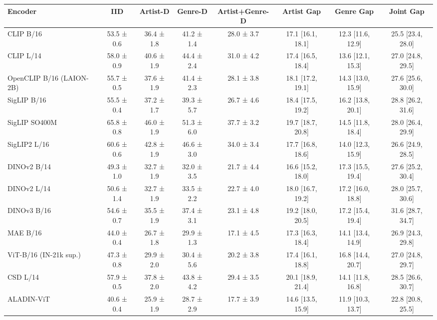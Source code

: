 \begin{tabular}{lccccccc}
\toprule
Encoder & IID & Artist-D & Genre-D & Artist+Genre-D & Artist Gap & Genre Gap & Joint Gap \\
\midrule
CLIP B/16 & 53.5 ± 0.6 & 36.4 ± 1.8 & 41.2 ± 1.4 & 28.0 ± 3.7 & 17.1 [16.1, 18.1] & 12.3 [11.6, 12.9] & 25.5 [23.4, 28.0] \\
CLIP L/14 & 58.0 ± 0.9 & 40.6 ± 1.9 & 44.4 ± 2.4 & 31.0 ± 4.2 & 17.4 [16.5, 18.4] & 13.6 [12.1, 15.3] & 27.0 [24.8, 29.5] \\
OpenCLIP B/16 (LAION-2B) & 55.7 ± 0.5 & 37.6 ± 1.9 & 41.4 ± 2.3 & 28.1 ± 3.8 & 18.1 [17.2, 19.1] & 14.3 [13.0, 15.9] & 27.6 [25.6, 30.0] \\
SigLIP B/16 & 55.5 ± 0.4 & 37.2 ± 1.7 & 39.3 ± 5.7 & 26.7 ± 4.6 & 18.4 [17.5, 19.2] & 16.2 [13.8, 20.1] & 28.8 [26.2, 31.6] \\
SigLIP SO400M & 65.8 ± 0.8 & 46.0 ± 1.9 & 51.3 ± 6.0 & 37.7 ± 3.2 & 19.7 [18.7, 20.8] & 14.5 [11.8, 18.4] & 28.0 [26.4, 29.9] \\
SigLIP2 L/16 & 60.6 ± 0.6 & 42.8 ± 1.9 & 46.6 ± 3.0 & 34.0 ± 3.4 & 17.7 [16.8, 18.6] & 14.0 [12.3, 15.9] & 26.6 [24.9, 28.5] \\
DINOv2 B/14 & 49.3 ± 1.0 & 32.7 ± 1.9 & 32.0 ± 3.5 & 21.7 ± 4.4 & 16.6 [15.2, 18.0] & 17.3 [15.5, 19.4] & 27.6 [25.2, 30.4] \\
DINOv2 L/14 & 50.6 ± 1.4 & 32.7 ± 1.9 & 33.5 ± 2.2 & 22.7 ± 4.0 & 18.0 [16.7, 19.2] & 17.2 [16.0, 18.8] & 28.0 [25.7, 30.6] \\
DINOv3 B/16 & 54.6 ± 0.7 & 35.5 ± 1.9 & 37.4 ± 3.1 & 23.1 ± 4.8 & 19.2 [18.0, 20.5] & 17.2 [15.4, 19.4] & 31.6 [28.7, 34.7] \\
MAE B/16 & 44.0 ± 0.4 & 26.7 ± 1.8 & 29.9 ± 1.3 & 17.1 ± 4.5 & 17.3 [16.3, 18.4] & 14.1 [13.4, 14.9] & 26.9 [24.3, 29.8] \\
ViT-B/16 (IN-21k sup.) & 47.3 ± 0.8 & 29.9 ± 2.0 & 30.4 ± 5.6 & 20.2 ± 3.8 & 17.4 [16.1, 18.8] & 16.8 [14.4, 20.7] & 27.0 [24.8, 29.7] \\
CSD L/14 & 57.9 ± 0.5 & 37.8 ± 2.0 & 43.8 ± 4.2 & 29.4 ± 3.5 & 20.1 [18.9, 21.4] & 14.1 [11.8, 16.8] & 28.5 [26.6, 30.7] \\
ALADIN-ViT & 40.6 ± 0.4 & 25.9 ± 1.9 & 28.7 ± 2.9 & 17.7 ± 3.9 & 14.6 [13.5, 15.9] & 11.9 [10.3, 13.7] & 22.8 [20.8, 25.5] \\
\bottomrule
\end{tabular}
